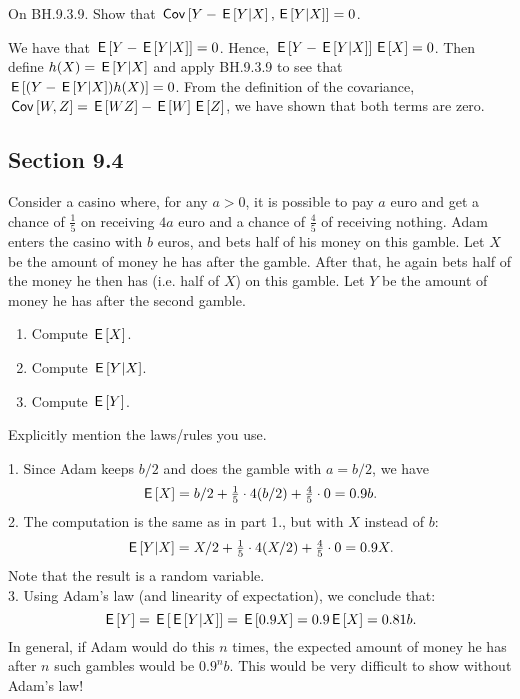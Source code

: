 \begin{exercise}
On BH.9.3.9. Show that $\,\mathsf{Cov}\left[Y-\,\mathsf{E}\left[Y|X\right], \,\mathsf{E}\left[Y|X\right]\right]=0$.
\begin{solution}
We have that $\,\mathsf{E}\left[Y-\,\mathsf{E}\left[Y|X\right]\right]=0$. Hence, $\,\mathsf{E}\left[Y-\,\mathsf{E}\left[Y|X\right]\right]\,\mathsf{E}\left[X\right] = 0$. Then define $h(X) = \,\mathsf{E}\left[Y|X\right]$ and apply BH.9.3.9 to see that $\,\mathsf{E}\left[(Y-\,\mathsf{E}\left[Y|X\right])h(X)\right] = 0$. From the definition of the covariance, $\,\mathsf{Cov}\left[W, Z\right] = \,\mathsf{E}\left[WZ\right] - \,\mathsf{E}\left[W\right] \,\mathsf{E}\left[Z\right]$, we have shown that both terms are zero.
\end{solution}
\end{exercise}


\subsection*{Section 9.4}
\label{sec:section-9.4}


\begin{exercise}
Consider a casino where, for any $a>0$, it is possible to pay $a$ euro and get a chance of $\tfrac15$ on receiving $4a$ euro and a chance of $\tfrac45$ of receiving nothing.
Adam enters the casino with $b$ euros, and bets half of his money on this gamble.
Let $X$ be the amount of money he has after the gamble.
After that, he again bets half of the money he then has (i.e.
half of $X$) on this gamble.
Let $Y$ be the amount of money he has after the second gamble.
\begin{enumerate}
\item Compute $\,\mathsf{E}\left[X\right]$.
\item Compute $\,\mathsf{E}\left[Y|X\right]$.
\item Compute $\,\mathsf{E}\left[Y\right]$.
\end{enumerate}
Explicitly mention the laws/rules you use.
\begin{solution}

1. Since Adam keeps $b/2$ and does the gamble with $a = b/2$, we have
\begin{equation*}
\,\mathsf{E}\left[X\right] = b/2 + \tfrac15 \cdot 4(b/2) + \tfrac45 \cdot 0 = 0.9 b.
\end{equation*}
2. The computation is the same as in part 1., but with $X$ instead of $b$:
\begin{equation*}
\,\mathsf{E}\left[Y|X\right] = X/2 + \tfrac15 \cdot 4(X/2) + \tfrac45 \cdot 0 = 0.9 X.
\end{equation*}
Note that the result is a random variable. \\
3. Using Adam's law (and linearity of expectation), we conclude that:
\begin{equation*}
\,\mathsf{E}\left[Y\right] = \,\mathsf{E}\left[\,\mathsf{E}\left[Y|X\right]\right] = \,\mathsf{E}\left[0.9X\right] = 0.9\,\mathsf{E}\left[X\right] = 0.81b.
\end{equation*}
In general, if Adam would do this $n$ times, the expected amount of money he has after $n$ such gambles would be $0.9^n b$. This would be very difficult to show without Adam's law!
\end{solution}
\end{exercise}


